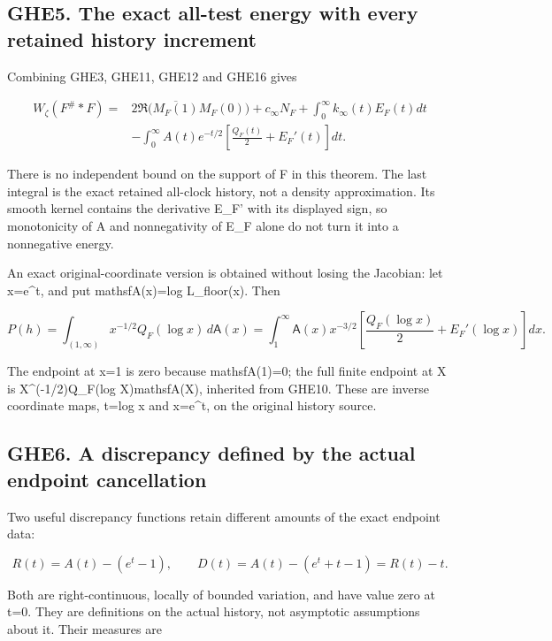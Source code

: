 \subsection{GHE5. The exact all-test energy with every retained history
increment}\label{ghe5.-the-exact-all-test-energy-with-every-retained-history-increment}

Combining GHE3, GHE11, GHE12 and GHE16 gives

\[
\boxed{\begin{aligned}
W_\zeta(F^\#*F)={}&
2\Re\big(\overline{M_F(1)}M_F(0)\big)
+c_\infty N_F+\int_0^\infty k_\infty(t)E_F(t)dt\\
&-\int_0^\infty A(t)e^{-t/2}
\left[\frac{Q_F(t)}2+E_F'(t)\right]dt.
\end{aligned}}
\tag{GHE18}
\]

There is no independent bound on the support of F in this theorem. The
last integral is the exact retained all-clock history, not a density
approximation. Its smooth kernel contains the derivative E\_F' with its
displayed sign, so monotonicity of A and nonnegativity of E\_F alone do
not turn it into a nonnegative energy.

An exact original-coordinate version is obtained without losing the
Jacobian: let x=e\^{}t, and put mathsfA(x)=log L\_floor(x). Then

\[
P(h)=\int_{(1,\infty)}x^{-1/2}Q_F(\log x)\,d\mathsf A(x)
=\int_1^\infty\mathsf A(x)x^{-3/2}
\left[\frac{Q_F(\log x)}2+E_F'(\log x)\right]dx.
\tag{GHE19}
\]

The endpoint at x=1 is zero because mathsfA(1)=0; the full finite
endpoint at X is X\^{}(-1/2)Q\_F(log X)mathsfA(X), inherited from GHE10.
These are inverse coordinate maps, t=log x and x=e\^{}t, on the original
history source.

\subsection{GHE6. A discrepancy defined by the actual endpoint
cancellation}\label{ghe6.-a-discrepancy-defined-by-the-actual-endpoint-cancellation}

Two useful discrepancy functions retain different amounts of the exact
endpoint data:

\[
R(t)=A(t)-(e^t-1),\qquad
D(t)=A(t)-(e^t+t-1)=R(t)-t.
\tag{GHE20}
\]

Both are right-continuous, locally of bounded variation, and have value
zero at t=0. They are definitions on the actual history, not asymptotic
assumptions about it. Their measures are

